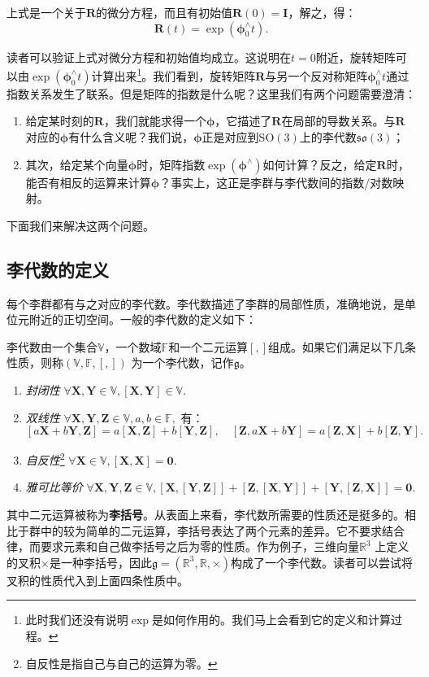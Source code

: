 上式是一个关于$\bm{R}$的微分方程，而且有初始值$\bm{R}(0) = \bm{I}$，解之，得：
\begin{equation}
\label{eq:so3ode}
\bm{R}(t) = \exp \left( \bm{\phi}_0^\wedge t \right).
\end{equation}

读者可以验证上式对微分方程和初始值均成立。这说明在$t = 0$附近，旋转矩阵可以由$\exp \left( \bm{\phi}_0^\wedge t \right)$计算出来\footnote{此时我们还没有说明$\exp$是如何作用的。我们马上会看到它的定义和计算过程。}。我们看到，旋转矩阵$\bm{R}$与另一个反对称矩阵$\bm{\phi}_0^\wedge t$通过指数关系发生了联系。但是矩阵的指数是什么呢？这里我们有两个问题需要澄清：

\begin{enumerate}
	\item 给定某时刻的$\bm{R}$，我们就能求得一个$\bm{\phi}$，它描述了$\bm{R}$在局部的导数关系。与$\bm{R}$对应的$\bm{\phi}$有什么含义呢？我们说，$\bm{\phi}$正是对应到$\mathrm{SO}(3)$上的李代数$\mathfrak{so}(3)$；
	\item 其次，给定某个向量$\bm{\phi}$时，矩阵指数$\exp (\bm{\phi} ^\wedge )$如何计算？反之，给定$\bm{R}$时，能否有相反的运算来计算$\bm{\phi}$？事实上，这正是李群与李代数间的指数/对数映射。
\end{enumerate}

下面我们来解决这两个问题。
\subsection{李代数的定义}
每个李群都有与之对应的李代数。李代数描述了李群的局部性质，准确地说，是单位元附近的正切空间。一般的李代数的定义如下：

李代数由一个集合$\mathbb{V}$，一个数域$\mathbb{F}$和一个二元运算$[,]$组成。如果它们满足以下几条性质，则称$(\mathbb{V}, \mathbb{F}, [,])$ 为一个李代数，记作$\mathfrak{g}$。

\begin{enumerate}
	\item{ \emph{封闭性} } \quad $\forall \bm{X}, \bm{Y} \in \mathbb{V}, [\bm{X}, \bm{Y}] \in \mathbb{V}$.
	\item{ \emph{双线性} } \quad $\forall \bm{X},\bm{Y},\bm{Z} \in \mathbb{V}, a,b \in \mathbb{F}, $ 有：
	\[
	[a\bm{X}+b\bm{Y}, \bm{Z}] = a[\bm{X}, \bm{Z}] + b [ \bm{Y}, \bm{Z} ], \quad [\bm{Z}, a \bm{X}+b\bm{Y}] = a [\bm{Z}, \bm{X} ]+ b [\bm{Z},\bm{Y}] .
	\]
	\item{ \emph{自反性}}\footnote{自反性是指自己与自己的运算为零。} \quad $\forall \bm{X} \in \mathbb{V}, [\bm{X},\bm{X}] = \bm{0}$.
	\item { \emph{雅可比等价} } \quad $\forall \bm{X},\bm{Y},\bm{Z} \in \mathbb{V}, [\bm{X}, [\bm{Y},\bm{Z}] ] + [\bm{Z}, [\bm{X},\bm{Y}] ] + [\bm{Y}, [\bm{Z},\bm{X}]] =\bm{0}$.
\end{enumerate}
其中二元运算被称为\textbf{李括号}。从表面上来看，李代数所需要的性质还是挺多的。相比于群中的较为简单的二元运算，李括号表达了两个元素的差异。它不要求结合律，而要求元素和自己做李括号之后为零的性质。作为例子，三维向量$\mathbb{R}^3$ 上定义的叉积$\times$是一种李括号，因此$\mathfrak{g} = (\mathbb{R}^3, \mathbb{R}, \times)$构成了一个李代数。读者可以尝试将叉积的性质代入到上面四条性质中。


